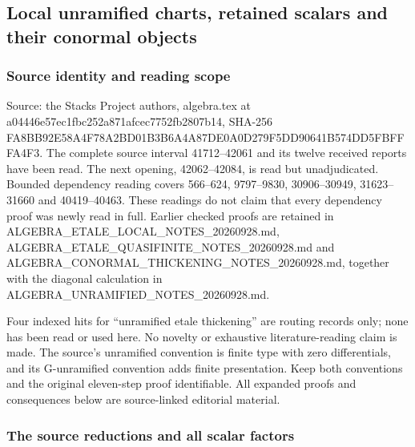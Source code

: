 \subsection{Local unramified charts, retained scalars and their conormal objects}\label{algebra-proof-057-local-unramified-charts-retained-scalars-and-their-conormal-objects}

\subsubsection{Source identity and reading scope}\label{algebra-proof-057-source-identity-and-reading-scope}

Source: the Stacks Project authors, algebra.tex at a044\allowbreak{}46e5\allowbreak{}7ec1\allowbreak{}fbc2\allowbreak{}52a8\allowbreak{}71af\allowbreak{}cec7\allowbreak{}752f\allowbreak{}b280\allowbreak{}7b14, SHA-256 FA8B\allowbreak{}B92E\allowbreak{}58A4\allowbreak{}F78A\allowbreak{}2BD0\allowbreak{}1B3B\allowbreak{}6A4A\allowbreak{}87DE\allowbreak{}0A0D\allowbreak{}279F\allowbreak{}5DD9\allowbreak{}0641\allowbreak{}B574\allowbreak{}DD5F\allowbreak{}BFFF\allowbreak{}A4F3. The complete source interval 41712--42061 and its twelve received reports have been read. The next opening, 42062--42084, is read but unadjudicated. Bounded dependency reading covers 566--624, 9797--9830, 30906--30949, 31623--31660 and 40419--40463. These readings do not claim that every dependency proof was newly read in full. Earlier checked proofs are retained in ALGEBRA\_\allowbreak{}ETALE\_\allowbreak{}LOCAL\_\allowbreak{}NOTES\_\allowbreak{}20260928.\allowbreak{}md, ALGEBRA\_\allowbreak{}ETALE\_\allowbreak{}QUASIFINITE\_\allowbreak{}NOTES\_\allowbreak{}20260928.\allowbreak{}md and ALGEBRA\_\allowbreak{}CONORMAL\_\allowbreak{}THICKENING\_\allowbreak{}NOTES\_\allowbreak{}20260928.\allowbreak{}md, together with the diagonal calculation in ALGEBRA\_\allowbreak{}UNRAMIFIED\_\allowbreak{}NOTES\_\allowbreak{}20260928.\allowbreak{}md.

Four indexed hits for ``unramified etale thickening'' are routing records only; none has been read or used here. No novelty or exhaustive literature-reading claim is made. The source's unramified convention is finite type with zero differentials, and its G-unramified convention adds finite presentation. Keep both conventions and the original eleven-step proof identifiable. All expanded proofs and consequences below are source-linked editorial material.

\subsubsection{The source reductions and all scalar factors}\label{algebra-proof-057-the-source-reductions-and-all-scalar-factors}

